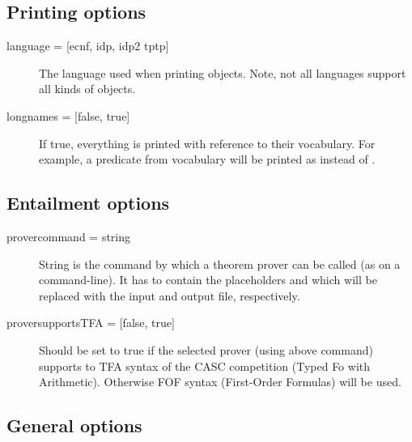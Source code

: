 \subsection{Printing options}
\begin{description}
	\item[{language = [ecnf, idp, idp2 %
				tptp]}] The language used when printing objects. Note, not all languages support all kinds of objects.
	\item[{longnames = [false, true]}] If true, everything is printed with reference to their vocabulary.  For example, a predicate  from vocabulary  will be printed as  instead of .
\end{description}

\subsection{Entailment options}
\begin{description}
	\item[{provercommand = string}] String is the command by which a theorem prover can be called (as on a command-line). It has to contain the placeholders  and  which will be replaced with the input and output file, respectively.
	\item[{proversupportsTFA = [false, true]}] Should be set to true if the selected prover (using above command) supports to TFA syntax of the CASC competition (Typed Fo with Arithmetic). Otherwise FOF syntax (First-Order Formulas) will be used.
\end{description}

\subsection{General options}

